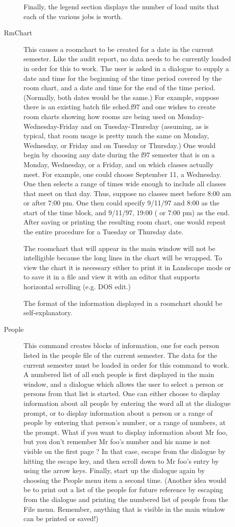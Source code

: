 \begin{description}
\begin{description}
Finally, the legend section displays the number of load units that each of
the various jobs is worth.  
\item[RmChart] This causes a roomchart to be created for a date in the
current semester. Like the audit report, no data needs to be currently loaded
in order for this to work. The user is asked in a dialogue to supply a date
and time for the beginning of the time period covered by the room chart, and
a date and time for the end of the time period. (Normally, both dates would
be the same.) For example, suppose there is an existing batch file sched.f97
and one wishes to create room charts showing how rooms are being used
on Monday-Wednesday-Friday  and on Tuesday-Thursday (assuming, as is typical,
that room usage is pretty much the same on Monday, Wednesday, or Friday and
on Tuesday or Thursday.) One would begin by choosing any date during the
f97 semester that is on a Monday, Wednesday, or a Friday, and on which classes
actually meet. For example, one could choose September 11, a Wednesday.   
One then selects a range of times wide enough to include all classes that
meet on that day. Thus, suppose no classes meet before 8:00 am or after 
7:00 pm. One then could specify 9/11/97 and 8:00 as the start of the time
block, and 9/11/97, 19:00 ( or 7:00 pm) as the end. After saving or printing
the resulting room chart, one would repeat the entire procedure for a Tuesday
or Thursday date. 

The roomchart that will appear in the main window will not be intelligible 
because the long lines in the chart will be wrapped. To view the chart it
is necessary either to print it in Landscape mode or to save it in a file
and view it with an editor that supports horizontal scrolling (e.g. DOS edit.)

The format of the information displayed in a roomchart should be self-explanatory. 

\item[People] This command creates blocks of information, one for each person
listed in the people file of the current semester. The data for the current
semester must be loaded in order for this command to work.
A numbered list of all
such people is first displayed in the main window, and a dialogue which allows
the user to select a person or persons from that list is started. One can
either choose to display information about all people by entering the word
all at the dialogue prompt, or to display information about a person or
a range of people by entering that person's number, or a range of numbers,
at the prompt. What if you want to display information about Mr foo, but
you don't remember Mr foo's number and his name is not visible on the first
page ? In that case, escape from the dialogue by hitting the escape key, and
then scroll down to Mr foo's entry by using the arrow keys. Finally, start
up the dialogue again by choosing the People menu item a second time. (Another
idea would be to print out a list of the people for future reference by 
escaping from the dialogue and printing the numbered list of people from the
File menu. Remember, anything that is visible in the main window can be
printed or saved!) 


\end{description}
\end{description}
